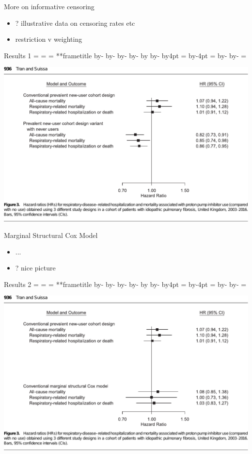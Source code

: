 \documentclass[aspectratio=169,12pt]{beamer} %
\makeatletter
\newif\ifsidebartheme
\newcommand*{\calculatespace}{%
    \contentheight=\paperheight%
    \ifx\beamer@frametitle\@empty%
        \setbox\@tempboxa=\box\voidb@x%
      \else%
        \setbox\@tempboxa=\vbox{%
          \vbox{}%
          {\parskip0pt\usebeamertemplate***{frametitle}}%
        }%
        \ifsidebartheme%
          \advance\contentheight by-1em%
        \fi%
      \fi%
    \advance\contentheight by-\ht\@tempboxa%
    \advance\contentheight by-\dp\@tempboxa%
    \advance\contentheight by-\beamer@frametopskip%
    \ifbeamer@plainframe%
    \contentbottom=0pt%
    \else%
    \advance\contentheight by-\headheight%
    \advance\contentheight by\headdp%
    \advance\contentheight by-\footheight%
    \advance\contentheight by4pt%
    \contentbottom=\footheight%
    \advance\contentbottom by-4pt%
    \fi%
    \contentwidth=\paperwidth%
    \ifbeamer@plainframe%
    \contentleft=0pt%
    \else%
    \advance\contentwidth by-\beamer@rightsidebar%
    \advance\contentwidth by-\beamer@leftsidebar\relax%
    \contentleft=\beamer@leftsidebar%
    \fi%
}
\makeatother
\begin{document}
\begin{frame}{More on informative censoring}
    \begin{itemize}
	\item ? illustrative data on censoring rates etc
	\item restriction v weighting
    \end{itemize}
\end{frame}

\begin{frame}{Results 1}
    \calculatespace%
    \begin{center}
	\includegraphics[height=0.90\contentheight]{ref/suissa-fig3-pnuc.pdf}
    \end{center}
\end{frame}

\begin{frame}{Marginal Structural Cox Model}
    \begin{itemize}
	\item ...
	\item ? nice picture
    \end{itemize}
\end{frame}

\begin{frame}{Results 2}
    \calculatespace%
    \begin{center}
	\includegraphics[height=0.90\contentheight]{ref/suissa-fig3-mscm.pdf}
    \end{center}
\end{frame}
\end{document}
